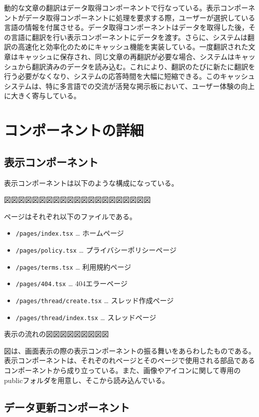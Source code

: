 \documentclass[b5paper,12pt]{jsreport}
\begin{document}
動的な文章の翻訳はデータ取得コンポーネントで行なっている。表示コンポーネントがデータ取得コンポーネントに処理を要求する際，ユーザーが選択している言語の情報を付属させる。データ取得コンポーネントはデータを取得した後，その言語に翻訳を行い表示コンポーネントにデータを渡す。さらに、システムは翻訳の高速化と効率化のためにキャッシュ機能を実装している。一度翻訳された文章はキャッシュに保存され、同じ文章の再翻訳が必要な場合、システムはキャッシュから翻訳済みのデータを読み込む。これにより、翻訳のたびに新たに翻訳を行う必要がなくなり、システムの応答時間を大幅に短縮できる。このキャッシュシステムは、特に多言語での交流が活発な掲示板において、ユーザー体験の向上に大きく寄与している。

\section{コンポーネントの詳細}


\subsection*{表示コンポーネント}

表示コンポーネントは以下のような構成になっている。

図図図図図図図図図図図図図図図図図図図図図

ページはそれぞれ以下のファイルである。

\begin{itemize}
    \item \texttt{/pages/index.tsx} … ホームページ
    \item \texttt{/pages/policy.tsx} … プライバシーポリシーページ
    \item \texttt{/pages/terms.tsx} … 利用規約ページ
    \item \texttt{/pages/404.tsx} … 404エラーページ
    \item \texttt{/pages/thread/create.tsx} … スレッド作成ページ
    \item \texttt{/pages/thread/index.tsx} … スレッドページ
\end{itemize}

表示の流れの図図図図図図図図図

図は、画面表示の際の表示コンポーネントの振る舞いをあらわしたものである。表示コンポーネントは、それぞのれページとそのページで使用される部品であるコンポーネントから成り立っている。また、画像やアイコンに関して専用のpublicフォルダを用意し、そこから読み込んでいる。

\subsection*{データ更新コンポーネント}
\end{document}
